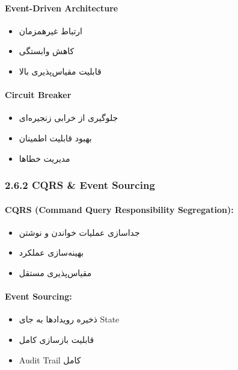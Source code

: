\documentclass[
]{article}
\providecommand{\tightlist}{%
  \setlength{\itemsep}{0pt}\setlength{\parskip}{0pt}}
\begin{document}
\paragraph{Event-Driven Architecture}\label{event-driven-architecture}

\begin{itemize}
\tightlist
\item
  ارتباط غیرهمزمان
\item
  کاهش وابستگی
\item
  قابلیت مقیاس‌پذیری بالا
\end{itemize}

\paragraph{Circuit Breaker}\label{circuit-breaker}

\begin{itemize}
\tightlist
\item
  جلوگیری از خرابی زنجیره‌ای
\item
  بهبود قابلیت اطمینان
\item
  مدیریت خطاها
\end{itemize}

\subsubsection{2.6.2 CQRS \& Event Sourcing}\label{cqrs-event-sourcing}

\paragraph{CQRS (Command Query Responsibility
Segregation):}\label{cqrs-command-query-responsibility-segregation}

\begin{itemize}
\tightlist
\item
  جداسازی عملیات خواندن و نوشتن
\item
  بهینه‌سازی عملکرد
\item
  مقیاس‌پذیری مستقل
\end{itemize}

\paragraph{Event Sourcing:}\label{event-sourcing}

\begin{itemize}
\tightlist
\item
  ذخیره رویدادها به جای State
\item
  قابلیت بازسازی کامل
\item
  Audit Trail کامل
\end{itemize}
\end{document}
